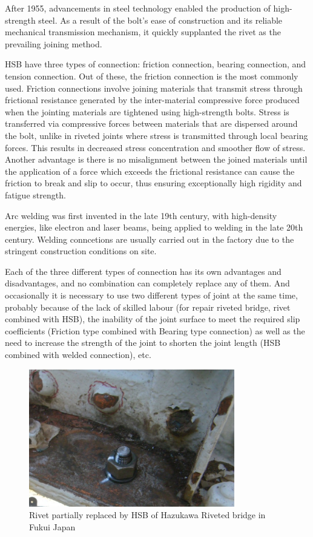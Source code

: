 After 1955, advancements in steel technology enabled the production of high-strength steel. As a result of the bolt's ease of construction and its reliable mechanical transmission mechanism, it quickly supplanted the rivet as the prevailing joining method.

\ac{HSB} have three types of connection: friction connection, bearing connection, and tension connection. Out of these, the friction connection is the most commonly used.
Friction connections involve joining materials that transmit stress through frictional resistance generated by the inter-material compressive force produced when the jointing materials are tightened using high-strength bolts. Stress is transferred via compressive forces between materials that are dispersed around the bolt, unlike in riveted joints where stress is transmitted through local bearing forces. This results in decreased stress concentration and smoother flow of stress. Another advantage is there is no misalignment between the joined materials until the application of a force which exceeds the frictional resistance can cause the friction to break and slip to occur, thus ensuring exceptionally high rigidity and fatigue strength.

Arc welding was first invented in the late 19th century, with high-density energies, like electron and laser beams, being applied to welding in the late 20th century. Welding conncetions are usually carried out in the factory due to the stringent construction conditions on site.

Each of the three different types of connection has its own advantages and disadvantages, and no combination can completely replace any of them. And occasionally it is necessary to use two different types of joint at the same time, probably because of the lack of skilled labour (for repair riveted bridge, rivet combined with HSB), the inability of the joint surface to meet the required slip coefficients (Friction type combined with Bearing type connection) as well as the need to increase the strength of the joint to shorten the joint length (HSB combined with welded connection), etc.



\begin{figure}
    \centering
    \includegraphics[width=0.8\textwidth]{imgs/intro/HSB-rivet.JPG}
    \caption{Rivet partially replaced by HSB of Hazukawa Riveted bridge in Fukui Japan}
    \label{fig:enter-label}
\end{figure}



